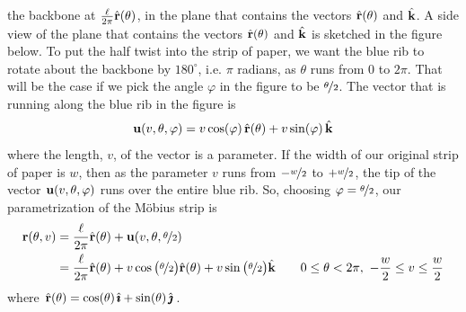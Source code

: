 \begin{eg}
the backbone at $\frac{\ell}{2\pi}\hat{\mathbf{r}}(\theta)$, in the plane
that contains the vectors $\hat{\mathbf{r}}(\theta)$ and $\hat{\mathbf{k}}$. 
A side view of the plane that contains the vectors $\hat{\mathbf{r}}(\theta)$ and $\hat{\mathbf{k}}$
is sketched in the figure below. 
To put the half twist into the strip of paper, we want the 
blue rib to rotate about the backbone by $180^\circ$, i.e. $\pi$ radians, 
as $\theta$ runs from $0$ to $2\pi$. That 
will be the case if we pick the angle $\varphi$ in the figure to be
$\nicefrac{\theta}{2}$. The vector that is running along the blue rib
in the figure is
\begin{equation*}
\mathbf{u}(v,\theta,\varphi)=v\cos(\varphi)\,\hat{\mathbf{r}}(\theta) + v\sin(\varphi)\,\hat{\mathbf{k}}
\end{equation*}  
where the length, $v$, of the vector is a parameter.
If the width of our original strip of paper is $w$, then as the parameter
$v$ runs from $-\nicefrac{w}{2}$ to $+\nicefrac{w}{2}$, the tip of the
vector $\mathbf{u}(v,\theta,\varphi)$ runs over the entire blue rib. 
So, choosing $\varphi=\nicefrac{\theta}{2}$, our parametrization 
of the M\"obius strip is
\begin{align*}
\mathbf{r}(\theta,v) 
 &= \frac{\ell}{2\pi}\hat{\mathbf{r}}(\theta) 
             + \mathbf{u}(v,\theta,\nicefrac{\theta}{2}) \\
 &= \frac{\ell}{2\pi}\hat{\mathbf{r}}(\theta) 
     + v\cos\big(\nicefrac{\theta}{2}\big) \hat{\mathbf{r}}(\theta)
      + v\sin\big(\nicefrac{\theta}{2}\big) \hat{\mathbf{k}}
\qquad 0\le\theta<2\pi,\ -\frac{w}{2}\le v\le \frac{w}{2}
\end{align*}
where $\hat{\mathbf{r}}(\theta) = \cos(\theta)\,\hat{\pmb{\imath}} + \sin(\theta)\,\hat{\pmb{\jmath}}$. 


\end{eg}
